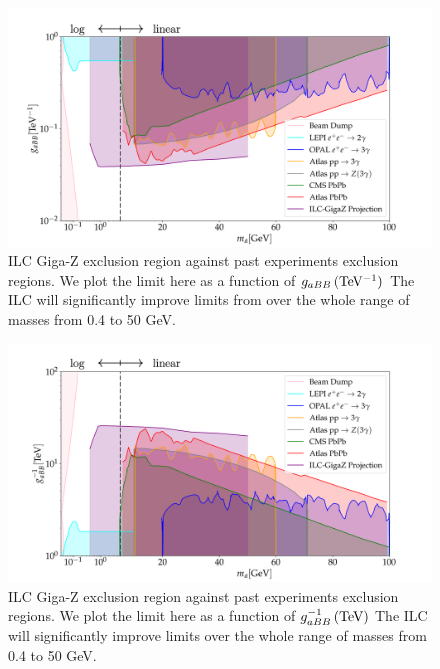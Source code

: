 \documentclass[aps,onecolumn,twoside,secnumarabic,12pt,balancelastpage,amsmath,amssymb,nofootinbib,hyperref=pdftex]{revtex4}
\begin{document}
\begin{figure}[t]
\begin{center}
\includegraphics[width=15cm]{new_constraint_g2.png}
\caption{ILC Giga-Z exclusion region against past experiments exclusion regions. We plot the limit here as a function of $g_{aBB}\,\rm{(TeV^{-1})}$ The ILC will significantly improve limits from over the whole range of masses from 0.4 to 50 GeV.}
\label{fig:money}
\end{center}
\end{figure}
\begin{figure}[t]
\begin{center}
\includegraphics[width=15cm]{new_constraint_lambda2.png}
\caption{ILC Giga-Z exclusion region against past experiments exclusion regions. We plot the limit here as a function of $g^{-1}_{aBB}\,\rm{(TeV)}$ The ILC will significantly improve limits over the whole range of masses from 0.4 to 50 GeV.}
\label{fig:money}
\end{center}
\end{figure}
\end{document}

